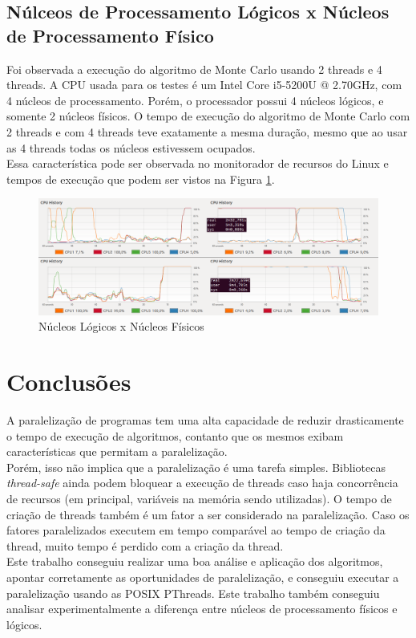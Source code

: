 \documentclass[12pt]{article}
\begin{document}
\subsection{Núlceos de Processamento Lógicos x Núcleos de Processamento Físico}

Foi observada a execução do algoritmo de Monte Carlo usando 2 threads e 4 threads.
A CPU usada para os testes é um Intel Core i5-5200U @ 2.70GHz, com 4 núcleos de processamento.
Porém, o processador possui 4 núcleos lógicos, e somente 2 núcleos físicos. O tempo de execução
do algoritmo de Monte Carlo com 2 threads e com 4 threads teve exatamente a mesma duração,
mesmo que ao usar as 4 threads todas os núcleos estivessem ocupados.\\

Essa característica pode ser observada no monitorador de recursos do Linux e tempos de execução
que podem ser vistos na Figura \ref{fig:LogicCoresXPhysicalCores}.\\

\begin{figure}[h]
	\centering
	\includegraphics[width=\textwidth]{fig03.png}
	\caption{Núcleos Lógicos x Núcleos Físicos}
	\label{fig:LogicCoresXPhysicalCores}
\end{figure}

\section{Conclusões}

A paralelização de programas tem uma alta capacidade de reduzir drasticamente o tempo
de execução de algoritmos, contanto que os mesmos exibam características que permitam a
paralelização.\\

Porém, isso não implica que a paralelização é uma tarefa simples. Bibliotecas
\textit{thread-safe} ainda podem bloquear a execução de threads caso haja concorrência
de recursos (em principal, variáveis na memória sendo utilizadas).
O tempo de criação de threads também é um fator a ser considerado na paralelização.
Caso os fatores paralelizados executem em tempo comparável ao tempo de criação da thread,
muito tempo é perdido com a criação da thread.\\

Este trabalho conseguiu realizar uma boa análise e aplicação dos algoritmos, apontar
corretamente as oportunidades de paralelização, e conseguiu executar a paralelização
usando as POSIX PThreads. Este trabalho também conseguiu analisar experimentalmente a
diferença entre núcleos de processamento físicos e lógicos.



\end{document}
